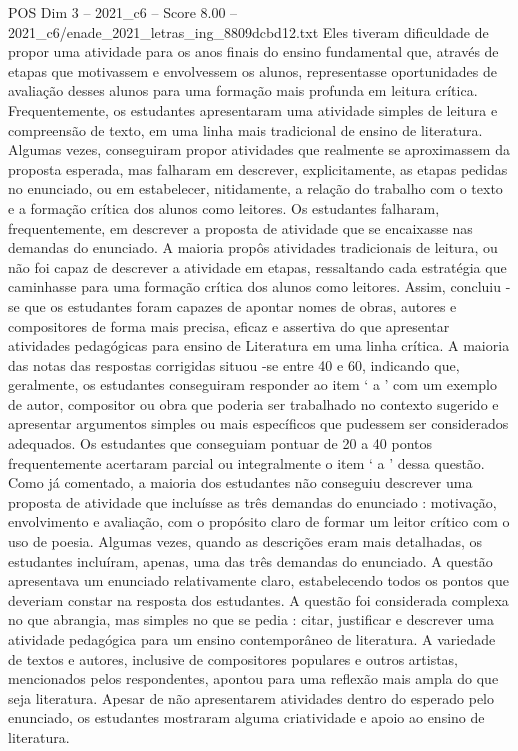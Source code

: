 \begin{textsample}{POS Dim 3 – 2021\_c6 – Score 8.00 – 2021\_c6/enade\_2021\_letras\_ing\_8809dcbd12.txt}
Eles tiveram dificuldade de propor uma atividade para os anos finais do ensino fundamental que, através de etapas que motivassem e envolvessem os alunos, representasse oportunidades de avaliação desses alunos para uma formação mais profunda em leitura crítica.
Frequentemente, os estudantes apresentaram uma atividade simples de leitura e compreensão de texto, em uma linha mais tradicional de ensino de literatura.
Algumas vezes, conseguiram propor atividades que realmente se aproximassem da proposta esperada, mas falharam em descrever, explicitamente, as etapas pedidas no enunciado, ou em estabelecer, nitidamente, a relação do trabalho com o texto e a formação crítica dos alunos como leitores.
Os estudantes falharam, frequentemente, em descrever a proposta de atividade que se encaixasse nas demandas do enunciado.
A maioria propôs atividades tradicionais de leitura, ou não foi capaz de descrever a atividade em etapas, ressaltando cada estratégia que caminhasse para uma formação crítica dos alunos como leitores.
Assim, concluiu -se que os estudantes foram capazes de apontar nomes de obras, autores e compositores de forma mais precisa, eficaz e assertiva do que apresentar atividades pedagógicas para ensino de Literatura em uma linha crítica.
A maioria das notas das respostas corrigidas situou -se entre 40 e 60, indicando que, geralmente, os estudantes conseguiram responder ao item ‘ a ’ com um exemplo de autor, compositor ou obra que poderia ser trabalhado no contexto sugerido e apresentar argumentos simples ou mais específicos que pudessem ser considerados adequados.
Os estudantes que conseguiam pontuar de 20 a 40 pontos frequentemente acertaram parcial ou integralmente o item ‘ a ’ dessa questão.
Como já comentado, a maioria dos estudantes não conseguiu descrever uma proposta de atividade que incluísse as três demandas do enunciado : motivação, envolvimento e avaliação, com o propósito claro de formar um leitor crítico com o uso de poesia.
Algumas vezes, quando as descrições eram mais detalhadas, os estudantes incluíram, apenas, uma das três demandas do enunciado.
A questão apresentava um enunciado relativamente claro, estabelecendo todos os pontos que deveriam constar na resposta dos estudantes.
A questão foi considerada complexa no que abrangia, mas simples no que se pedia : citar, justificar e descrever uma atividade pedagógica para um ensino contemporâneo de literatura.
A variedade de textos e autores, inclusive de compositores populares e outros artistas, mencionados pelos respondentes, apontou para uma reflexão mais ampla do que seja literatura.
Apesar de não apresentarem atividades dentro do esperado pelo enunciado, os estudantes mostraram alguma criatividade e apoio ao ensino de literatura.

\end{textsample}
